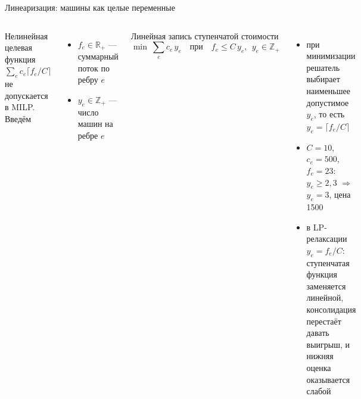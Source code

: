 \documentclass[aspectratio=169,10pt]{beamer}
\newcommand{\Real}{\mathbb{R}}
\newcommand{\Int}{\mathbb{Z}}
\begin{document}
\begin{frame}{Линеаризация: машины как целые переменные}
\begin{columns}[T]
Нелинейная целевая функция $\sum_e c_e\lceil f_e/C\rceil$ не допускается в MILP. Введём
\begin{itemize}
\item $f_e\in\Real_+$ --- суммарный поток по ребру $e$
\item $y_e\in\Int_+$ --- число машин на ребре $e$
\end{itemize}
\begin{block}{Линейная запись ступенчатой стоимости}
\[
\min\ \sum_{e} c_e\,y_e\quad\text{при}\quad f_e\le C\,y_e,\ \ y_e\in\Int_+
\]
\end{block}
\begin{itemize}\setlength{\itemsep}{4pt}
\item при минимизации решатель выбирает наименьшее допустимое $y_e$, то есть $y_e=\lceil f_e/C\rceil$
\item $C=10$, $c_e=500$, $f_e=23$: $y_e\ge2{,}3$ $\Rightarrow$ $y_e=3$, цена 1500
\item в LP-релаксации $y_e=f_e/C$: ступенчатая функция заменяется линейной, \alert{консолидация перестаёт давать выигрыш}, и нижняя оценка оказывается слабой
\end{itemize}
\end{columns}
\end{frame}
\end{document}
